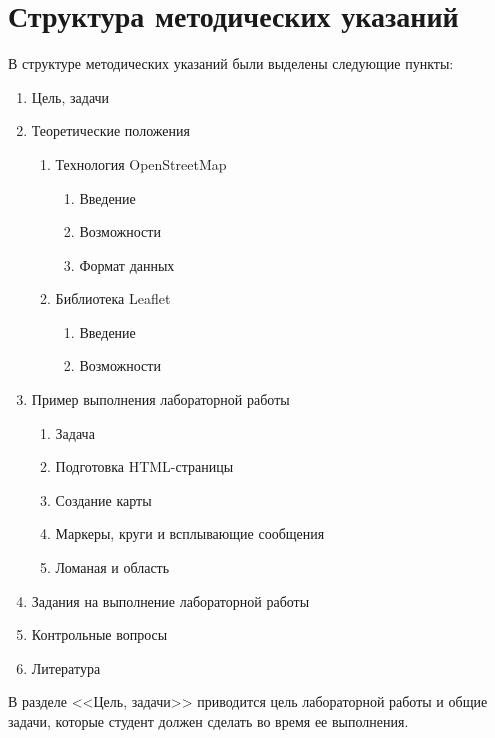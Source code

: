 \documentclass[a4paper, 14pt]{extreport}
\begin{document}
    \newpage

    \section{Структура методических указаний}
    В структуре методических указаний были выделены следующие пункты:
    \begin{enumerate}
        \item Цель, задачи
        \item Теоретические положения
        \begin{enumerate}
            \item Технология OpenStreetMap
            \begin{enumerate}
                \item Введение
                \item Возможности
                \item Формат данных
            \end{enumerate}
            \item Библиотека Leaflet
            \begin{enumerate}
                \item Введение
                \item Возможности
            \end{enumerate}
        \end{enumerate}
        \item Пример выполнения лабораторной работы
        \begin{enumerate}
            \item Задача
            \item Подготовка HTML-страницы
            \item Создание карты
            \item Маркеры, круги и всплывающие сообщения
            \item Ломаная и область
        \end{enumerate}
        \item Задания на выполнение лабораторной работы
        \item Контрольные вопросы
        \item Литература
    \end{enumerate}

    \newpage

    В разделе <<Цель, задачи>> приводится цель лабораторной работы и общие
    задачи, которые студент должен сделать во время ее выполнения.
\end{document}
